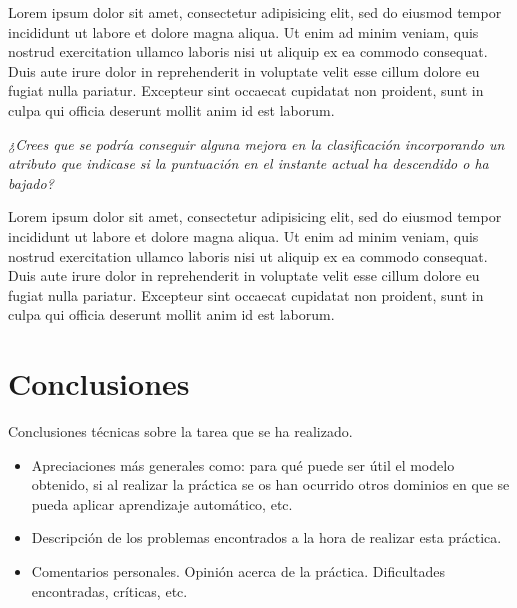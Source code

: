 \documentclass[12pt]{article}
\begin{document}
Lorem ipsum dolor sit amet, consectetur adipisicing elit, sed do eiusmod tempor incididunt ut labore et dolore magna aliqua. Ut enim ad minim veniam, quis nostrud exercitation ullamco laboris nisi ut aliquip ex ea commodo consequat. Duis aute irure dolor in reprehenderit in voluptate velit esse cillum dolore eu fugiat nulla pariatur. Excepteur sint occaecat cupidatat non proident, sunt in culpa qui officia deserunt mollit anim id est laborum.

\begin{center}
    \vspace{0.5cm} \emph{¿Crees que se podría conseguir alguna mejora en la clasificación incorporando un atributo que indicase si la puntuación en el instante actual ha descendido o ha bajado?}
    \vspace{0.5cm}
\end{center}

Lorem ipsum dolor sit amet, consectetur adipisicing elit, sed do eiusmod tempor incididunt ut labore et dolore magna aliqua. Ut enim ad minim veniam, quis nostrud exercitation ullamco laboris nisi ut aliquip ex ea commodo consequat. Duis aute irure dolor in reprehenderit in voluptate velit esse cillum dolore eu fugiat nulla pariatur. Excepteur sint occaecat cupidatat non proident, sunt in culpa qui officia deserunt mollit anim id est laborum.

\section{Conclusiones}

Conclusiones técnicas sobre la tarea que se ha realizado.
\begin{itemize}
  \item Apreciaciones más generales como: para qué puede ser útil el modelo obtenido, si al realizar la práctica se os han ocurrido otros dominios en que se pueda aplicar aprendizaje automático, etc.
  \item Descripción de los problemas encontrados a la hora de realizar esta práctica.
  \item Comentarios personales. Opinión acerca de la práctica. Dificultades encontradas, críticas, etc.
\end{itemize}
\end{document}
